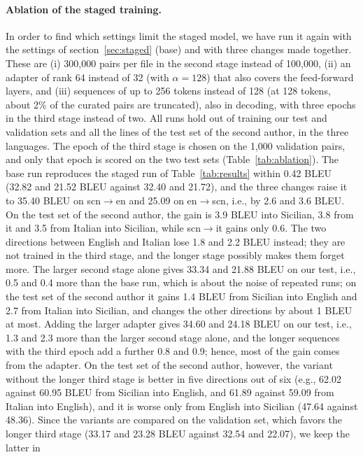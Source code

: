 \documentclass[11pt,a4paper]{article}
\begin{document}
\paragraph{Ablation of the staged training.}
In order to find which settings limit the staged model, we have run it again with the settings of
section~\ref{sec:staged} (base) and with three changes made together. These are (i) 300{,}000
pairs per file in the second stage instead of 100{,}000, (ii) an adapter of rank 64 instead of 32 (with $\alpha{=}128$)
that also covers the feed-forward layers, and (iii) sequences of up to 256 tokens instead of 128
(at 128 tokens, about 2\% of the curated pairs are truncated), also in decoding, with three epochs in the third stage
instead of two. All runs hold out of training our test and validation sets and all the lines of
the test set of the second author, in the three languages. The epoch of the third stage is chosen
on the 1{,}000 validation pairs, and only that epoch is scored on the two test sets
(Table~\ref{tab:ablation}). The base run reproduces the staged run of Table~\ref{tab:results}
within 0.42 BLEU (32.82 and 21.52 BLEU against 32.40 and 21.72), and the three changes raise it to
35.40 BLEU on scn$\to$en and 25.09 on en$\to$scn, i.e., by 2.6 and 3.6 BLEU. On the test set of
the second author, the gain is 3.9 BLEU into Sicilian, 3.8 from it and 3.5 from Italian into
Sicilian, while scn$\to$it gains only 0.6. The two directions between English and Italian lose
1.8 and 2.2 BLEU instead; they are not trained in the third stage, and the longer stage possibly
makes them forget more. The larger second stage alone gives 33.34 and 21.88 BLEU on our test,
i.e., 0.5 and 0.4 more than the base run, which is about the noise of repeated runs; on the test
set of the second author it gains 1.4 BLEU from Sicilian into English and 2.7 from Italian into
Sicilian, and changes the other directions by about 1 BLEU at most. Adding the larger adapter gives
34.60 and 24.18 BLEU on our test, i.e., 1.3 and 2.3 more than the larger second stage alone, and
the longer sequences with the third epoch add a further 0.8 and 0.9; hence, most of the gain comes
from the adapter. On the test set of the second author, however, the variant without the longer
third stage is better in five directions out of six (e.g., 62.02 against 60.95 BLEU from Sicilian
into English, and 61.89 against 59.09 from Italian into English), and it is worse only from English
into Sicilian (47.64 against 48.36). Since the variants are compared on the validation set, which
favors the longer third stage (33.17 and 23.28 BLEU against 32.54 and 22.07), we keep the latter in
\end{document}
